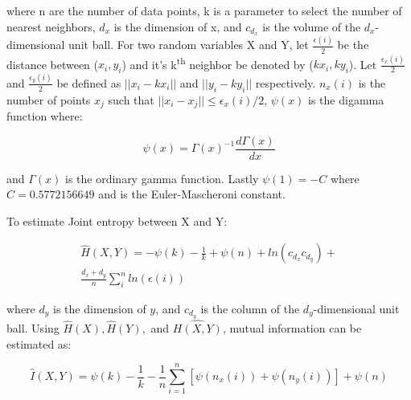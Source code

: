 \noindent where n are the number of data points, k is a parameter to select the number of nearest neighbors,  \(d_x\) is the dimension of x, and \(c_{d_x}\) is the volume of the \(d_x\)-dimensional unit ball. For two random variables X and Y, let \( \frac{\epsilon(i)}{2} \) be the distance between (\(x_i,y_i\)) and it's k\textsuperscript{th} neighbor be denoted by (\(kx_i,ky_i\)). Let \(\frac{\epsilon_x(i)}{2}\) and  \(\frac{\epsilon_y(i)}{2}\) be defined as \( ||x_i-kx_i ||\) and \( ||y_i-ky_i || \) respectively. \(n_x(i)\) is the number of points \(x_j\) such that \(||x_i - x_j  || \leq \epsilon_x(i)/2\), \(\psi(x)\) is the digamma function where:

\begin{equation}
\psi(x) = \Gamma(x)^{-1} \frac{d\Gamma(x)} {dx}
\end{equation}

\noindent and  \(\Gamma(x)\) is the ordinary gamma function. Lastly \(\psi(1) = -C\) where \(C=0.5772156649\) and is the Euler-Mascheroni constant. %

To estimate Joint entropy between X and Y: 

\setlength{\arraycolsep}{0.0em}
\begin{eqnarray}
\hat{H}(X,Y) = - \psi(k) - \frac{1}{k} + \psi(n) + ln(c_{d_x} c_{d_y})  +  \nonumber\\
\frac{d_x + d_y}{n} \sum^n_i ln(\epsilon(i))
\end{eqnarray}
\setlength{\arraycolsep}{1pt}


\noindent where \(d_y\) is the dimension of \(y\), and \(c_{d_y}\) is the column of the \(d_y\)-dimensional unit ball. Using \(\hat{H}(X), \hat{H}(Y),\) and \(\hat{H(X,Y)}\), mutual information can be estimated as:

\begin{equation}
\label{KraskovEquation}
\hat{I}(X,Y) = \psi(k) - \frac{1}{k} - \frac{1}{n}  \sum_{i=1}^n [\psi(n_x(i)) + \psi(n_y(i))] + \psi(n)
\end{equation}


